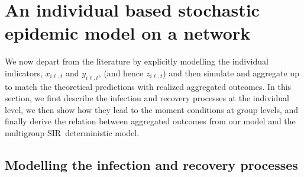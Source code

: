 \documentclass[12pt]{article}
\begin{document}
\section{An individual based stochastic epidemic model on a
network\label{Sec: model}}

We now depart from the literature by explicitly modelling the individual
indicators, $x_{i\ell,t}$ and $y_{i\ell,t}$, (and hence $z_{i\ell,t}$) and
then simulate and aggregate up to match the theoretical predictions with
realized aggregated outcomes. In this section, we first describe the infection
and recovery processes at the individual level, we then show how they lead to
the moment conditions at group levels, and finally derive the relation between
aggregated outcomes from our model and the multigroup SIR\ deterministic model.

\subsection{Modelling the infection and recovery processes}
\end{document}
